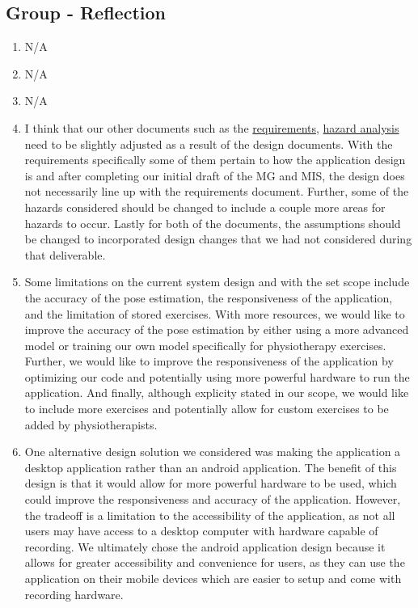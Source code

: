 \documentclass[12pt, titlepage]{article}
\begin{document}
\subsection*{Group - Reflection}
\begin{enumerate}
  \item N/A
  \item N/A
  \item N/A
  \item I think that our other documents such as the \href{https://github.com/M9Huynh/technically-functional/blob/main/docs/SRS/SRS.pdf}{requirements}, \href{https://github.com/M9Huynh/technically-functional/blob/main/docs/HazardAnalysis/HazardAnalysis.pdf}{hazard analysis} need to be slightly adjusted as a result of the design documents. With the requirements specifically some of them pertain to how the application design is and after completing our initial draft of the MG and MIS, the design does not necessarily line up with the requirements document. Further, some of the hazards considered should be changed to include a couple more areas for hazards to occur. Lastly for both of the documents, the assumptions should be changed to incorporated design changes that we had not considered during that deliverable. 
  \item Some limitations on the current system design and with the set scope include the accuracy of the pose estimation, the responsiveness of the application, and the limitation of stored exercises. With more resources, we would like to improve the accuracy of the pose estimation by either using a more advanced model or training our own model specifically for physiotherapy exercises. Further, we would like to improve the responsiveness of the application by optimizing our code and potentially using more powerful hardware to run the application. And finally, although explicity stated in our scope, we would like to include more exercises and potentially allow for custom exercises to be added by physiotherapists.
  
  \item One alternative design solution we considered was making the application a desktop application rather than an android application. The benefit of this design is that it would allow for more powerful hardware to be used, which could improve the responsiveness and accuracy of the application. However, the tradeoff is a limitation to the accessibility of the application, as not all users may have access to a desktop computer with hardware capable of recording. We ultimately chose the android application design because it allows for greater accessibility and convenience for users, as they can use the application on their mobile devices which are easier to setup and come with recording hardware.
  

\end{enumerate}
\end{document}
